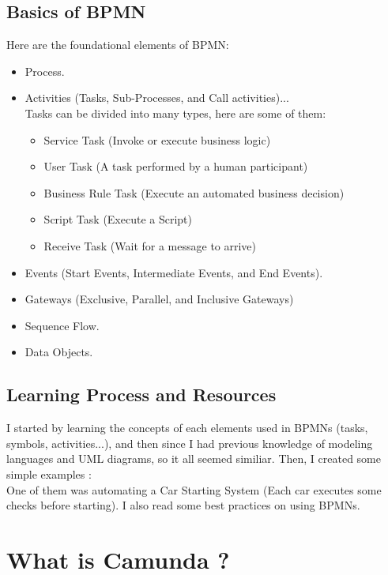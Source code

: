 \documentclass[12pt]{article}
\begin{document}
{  \subsection{Basics of BPMN}

  Here are the foundational elements of BPMN:

  \begin{itemize}[noitemsep,nolistsep]
    \item Process.
    \item Activities (Tasks, Sub-Processes, and Call activities)...\\
      Tasks can be divided into many types, here are some of them:
      \begin{itemize}[noitemsep,nolistsep]
        \item Service Task (Invoke or execute business logic)
        \item User Task (A task performed by a human participant)
        \item Business Rule Task (Execute an automated business decision)
        \item Script Task (Execute a Script)
        \item Receive Task (Wait for a message to arrive)
      \end{itemize}

    \item Events (Start Events, Intermediate Events, and End Events).
    \item Gateways (Exclusive, Parallel, and Inclusive Gateways)
    \item Sequence Flow.
    \item Data Objects.
  \end{itemize}

  \subsection{Learning Process and Resources}
  I started by learning the concepts of each elements used in BPMNs (tasks, symbols, activities...), and then since I had previous knowledge of modeling languages and UML diagrams, so it all seemed similiar.
  Then, I created some simple examples :
  \\
  One of them was automating a Car Starting System (Each car executes some checks before starting).
  I also read some best practices on using BPMNs.

  \pagebreak

  \section{What is Camunda ?}

}
\end{document}
